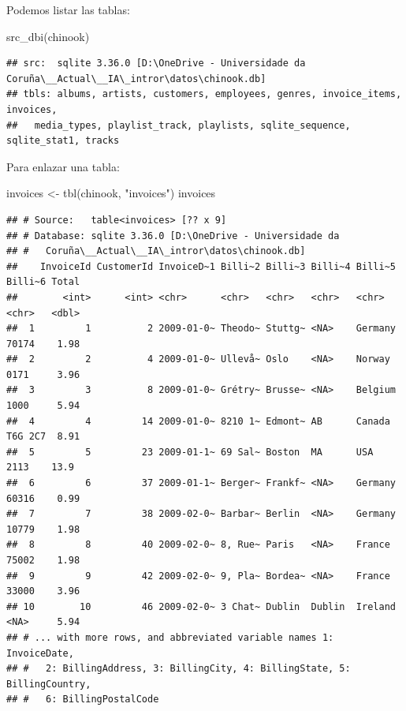 \documentclass[
]{book}
\newenvironment{Shaded}{\begin{snugshade}}{\end{snugshade}}
\newcommand{\FunctionTok}[1]{\textcolor[rgb]{0.00,0.00,0.00}{#1}}
\newcommand{\NormalTok}[1]{#1}
\newcommand{\OtherTok}[1]{\textcolor[rgb]{0.56,0.35,0.01}{#1}}
\newcommand{\StringTok}[1]{\textcolor[rgb]{0.31,0.60,0.02}{#1}}
\theoremstyle{break}
\theoremstyle{nonumberplain}
\begin{document}
Podemos listar las tablas:

\begin{Shaded}
\begin{Highlighting}[]
\FunctionTok{src\_dbi}\NormalTok{(chinook)}
\end{Highlighting}
\end{Shaded}

\begin{verbatim}
## src:  sqlite 3.36.0 [D:\OneDrive - Universidade da Coruña\__Actual\__IA\_intror\datos\chinook.db]
## tbls: albums, artists, customers, employees, genres, invoice_items, invoices,
##   media_types, playlist_track, playlists, sqlite_sequence, sqlite_stat1, tracks
\end{verbatim}

Para enlazar una tabla:

\begin{Shaded}
\begin{Highlighting}[]
\NormalTok{invoices }\OtherTok{\textless{}{-}} \FunctionTok{tbl}\NormalTok{(chinook, }\StringTok{"invoices"}\NormalTok{)}
\NormalTok{invoices}
\end{Highlighting}
\end{Shaded}

\begin{verbatim}
## # Source:   table<invoices> [?? x 9]
## # Database: sqlite 3.36.0 [D:\OneDrive - Universidade da
## #   Coruña\__Actual\__IA\_intror\datos\chinook.db]
##    InvoiceId CustomerId InvoiceD~1 Billi~2 Billi~3 Billi~4 Billi~5 Billi~6 Total
##        <int>      <int> <chr>      <chr>   <chr>   <chr>   <chr>   <chr>   <dbl>
##  1         1          2 2009-01-0~ Theodo~ Stuttg~ <NA>    Germany 70174    1.98
##  2         2          4 2009-01-0~ Ullevå~ Oslo    <NA>    Norway  0171     3.96
##  3         3          8 2009-01-0~ Grétry~ Brusse~ <NA>    Belgium 1000     5.94
##  4         4         14 2009-01-0~ 8210 1~ Edmont~ AB      Canada  T6G 2C7  8.91
##  5         5         23 2009-01-1~ 69 Sal~ Boston  MA      USA     2113    13.9 
##  6         6         37 2009-01-1~ Berger~ Frankf~ <NA>    Germany 60316    0.99
##  7         7         38 2009-02-0~ Barbar~ Berlin  <NA>    Germany 10779    1.98
##  8         8         40 2009-02-0~ 8, Rue~ Paris   <NA>    France  75002    1.98
##  9         9         42 2009-02-0~ 9, Pla~ Bordea~ <NA>    France  33000    3.96
## 10        10         46 2009-02-0~ 3 Chat~ Dublin  Dublin  Ireland <NA>     5.94
## # ... with more rows, and abbreviated variable names 1: InvoiceDate,
## #   2: BillingAddress, 3: BillingCity, 4: BillingState, 5: BillingCountry,
## #   6: BillingPostalCode
\end{verbatim}
\end{document}
